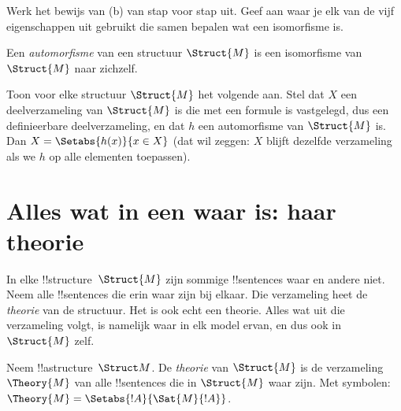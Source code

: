 \documentclass[openany]{memoir}
\begin{document}
\begin{prob}
Werk het bewijs van (b) van  stap voor
stap uit. Geef aan waar je elk van de vijf eigenschappen uit
 gebruikt die samen bepalen wat
een isomorfisme is.
\end{prob}

\begin{defn}
Een \emph{automorfisme} van een structuur $\Struct{M}$ is een
isomorfisme van $\Struct{M}$ naar zichzelf.
\end{defn}

\begin{prob}
Toon voor elke structuur $\Struct{M}$ het volgende aan. Stel dat $X$ een
deelverzameling van $\Struct{M}$ is die met een formule is vastgelegd,
dus een definieerbare deelverzameling, en dat $h$ een automorfisme van
$\Struct{M}$ is. Dan $X = \Setabs{h(x)}{x \in X}$ (dat wil zeggen: $X$
blijft dezelfde verzameling als we $h$ op alle elementen toepassen).
\end{prob}
\endgroup

\begingroup
\def\olfilename{OLP-0188}
\def\olfilepath{content/model-theory/basics/}
\hypertarget{unit-OLP-0188}{}




\section{Alles wat in een  waar is: haar theorie}

In elke !!{structure}~$\Struct{M}$ zijn sommige !!{sentence}s waar en
andere niet. Neem alle !!{sentence}s die erin waar zijn bij elkaar. Die
verzameling heet de \emph{theorie} van de structuur. Het is ook echt een
theorie. Alles wat uit die verzameling volgt, is namelijk waar in elk
model ervan, en dus ook in~$\Struct{M}$ zelf.

\begin{defn}
  Neem !!a{structure}~$\Struct M$. De \emph{theorie} van
  $\Struct{M}$ is de verzameling $\Theory{M}$ van alle !!{sentence}s
  die in $\Struct{M}$ waar zijn. Met symbolen: $\Theory{M} =
  \Setabs{!A}{\Sat{M}{!A}}$.
\end{defn}
\end{document}
